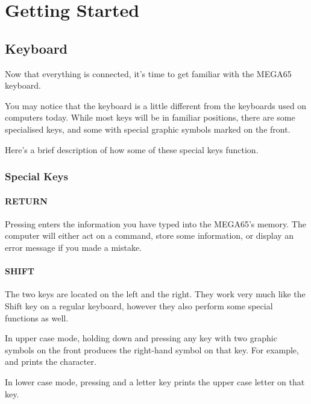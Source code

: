 \chapter{Getting Started}
\hypersetup{bookmarksdepth=5}


\section{Keyboard}
\label{cha:getting-started}

Now that everything is connected, it's time to get familiar with the MEGA65 keyboard.

You may notice that the keyboard is a little different from the keyboards used on computers today. While most keys will be in familiar positions, there are some specialised keys, and some with special graphic symbols marked on the front.

Here's a brief description of how some of these special keys function.

\subsection{Special Keys}

\subsubsection{RETURN}
Pressing  enters the information you have typed into the MEGA65's memory. The computer will either act on a command, store some information, or display an error message if you made a mistake.

\subsubsection{SHIFT}
The two  keys are located on the left and the right. They work very much like the Shift key on a regular keyboard, however they also perform some special functions as well.

In upper case mode, holding down  and pressing any key with two graphic symbols on the front produces the right-hand symbol on that key. For example,  and  prints the  character.

In lower case mode, pressing  and a letter key prints the upper case letter on that key.


